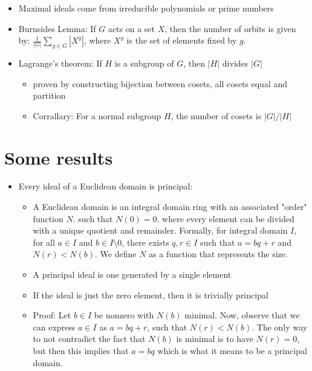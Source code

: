 \documentclass[11pt]{article}
\begin{document}
\begin{itemize}
\begin{itemize}
    \end{itemize}
    \item Maximal ideals come from irreducible polynomials or prime numbers
    \item Burnsides Lemma: If $G$ acts on a set $X$, then the number of orbits is given by: $\frac{1}{|G|} \sum_{g \in G} |X^g|$, where $X^g$ is the set of elements fixed by $g$.    
    \item Lagrange's theorem: If $H$ is a subgroup of $G$, then $|H|$ divides $|G|$
        \begin{itemize}
            \item proven by constructing bijection between cosets, all cosets equal and partition
            \item Corrallary: For a normal subgroup $H$, the number of cosets is $|G| / |H|$
        \end{itemize}
\end{itemize}

\newpage
\section{Some results}
\begin{itemize}
    \item Every ideal of a Euclidean domain is principal:
        \begin{itemize}
            \item A Euclidean domain is an integral domain ring with an associated "order" function $N$. such that $N(0) = 0$. where every element can be divided with a unique quotient and remainder. Formally, for integral domain $I$, for all $a \in I$ and $b \in I \setminus 0$, there exists $q, r \in I$ such that $a = bq + r$ and $N(r) < N(b)$. We define $N$ as a function that represents the size. 
            \item A principal ideal is one generated by a single element
            \item If the ideal is just the zero element, then it is trivially principal
            \item Proof: Let $b \in I$ be nonzero with $N(b)$ minimal. Now, observe that we can express $a \in I$ as $a = bq + r$, such that $N(r) < N(b)$. The only way to not contradict the fact that $N(b)$ is minimal is to have $N(r) = 0$, but then this implies that $a = bq$ which is what it means to be a principal domain.
        \end{itemize}
\end{itemize}
\end{document}
